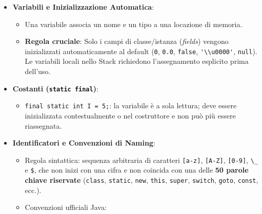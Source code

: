 \documentclass[11pt,a4paper,oneside]{report}
\newcommand{\passthrough}[1]{#1}
\providecommand{\tightlist}{\setlength{\itemsep}{0pt}\setlength{\parskip}{0pt}}
\begin{document}
\begin{itemize}
\tightlist
\item
  \textbf{Variabili e Inizializzazione Automatica}:

  \begin{itemize}
  \tightlist
  \item
    Una variabile associa un nome e un tipo a una locazione di memoria.
  \item
    \textbf{Regola cruciale}: Solo i campi di classe/istanza
    (\emph{fields}) vengono inizializzati automaticamente al default
    (\passthrough{\lstinline!0!}, \passthrough{\lstinline!0.0!},
    \passthrough{\lstinline!false!},
    \passthrough{\lstinline!'\\u0000'!},
    \passthrough{\lstinline!null!}). Le variabili locali nello Stack
    richiedono l'assegnamento esplicito prima dell'uso.
  \end{itemize}
\item
  \textbf{Costanti (\passthrough{\lstinline!static final!})}:

  \begin{itemize}
  \tightlist
  \item
    \passthrough{\lstinline!final static int I = 5;!}: la variabile è a
    sola lettura; deve essere inizializzata contestualmente o nel
    costruttore e non può più essere riassegnata.
  \end{itemize}
\item
  \textbf{Identificatori e Convenzioni di Naming}:

  \begin{itemize}
  \tightlist
  \item
    Regola sintattica: sequenza arbitraria di caratteri
    \passthrough{\lstinline![a-z]!}, \passthrough{\lstinline![A-Z]!},
    \passthrough{\lstinline![0-9]!}, \passthrough{\lstinline!\_!} e
    \passthrough{\lstinline!$!}, che non inizi con una cifra e non
    coincida con una delle \textbf{50 parole chiave riservate}
    (\passthrough{\lstinline!class!}, \passthrough{\lstinline!static!},
    \passthrough{\lstinline!new!}, \passthrough{\lstinline!this!},
    \passthrough{\lstinline!super!}, \passthrough{\lstinline!switch!},
    \passthrough{\lstinline!goto!}, \passthrough{\lstinline!const!},
    ecc.).
  \item
    Convenzioni ufficiali Java:


\end{itemize}
\end{itemize}
\end{document}
